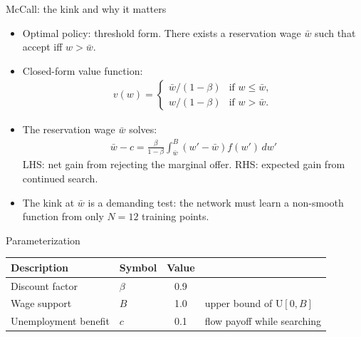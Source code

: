 \documentclass[aspectratio=169,10pt]{beamer}
\begin{document}
\begin{frame}{McCall: the kink and why it matters}
	\begin{itemize}
		\item Optimal policy: threshold form. There exists a reservation wage $\bar{w}$ such that accept iff $w > \bar{w}$.
		\item Closed-form value function:
		\begin{align*}
			v(w) = \begin{cases} \bar{w}/(1-\beta) & \text{if } w \le \bar{w}, \\ w/(1-\beta) & \text{if } w > \bar{w}. \end{cases}
		\end{align*}
		\item The reservation wage $\bar{w}$ solves:
		\begin{align*}
			\bar{w} - c = \frac{\beta}{1-\beta} \int_{\bar{w}}^B (w' - \bar{w}) f(w')\, dw'
		\end{align*}
		LHS: net gain from rejecting the marginal offer. RHS: expected gain from continued search.
		\item The kink at $\bar{w}$ is a demanding test: the network must learn a non-smooth function from only $N = 12$ training points.
	\end{itemize}
\end{frame}

\begin{frame}{Parameterization}
	\vspace{0.2in}
	\begin{center}
		\begin{tabular}{llcl}
			\toprule
			Description & Symbol & Value & \\
			\midrule
			Discount factor      & $\beta$ & \textcolor{emphcolorval}{0.9} & \\
			Wage support         & $B$     & \textcolor{emphcolorval}{1.0} & upper bound of $\mathrm{U}[0,B]$ \\
			Unemployment benefit & $c$     & \textcolor{emphcolorval}{0.1} & flow payoff while searching \\
			\bottomrule
		\end{tabular}
	\end{center}
\end{frame}
\end{document}
